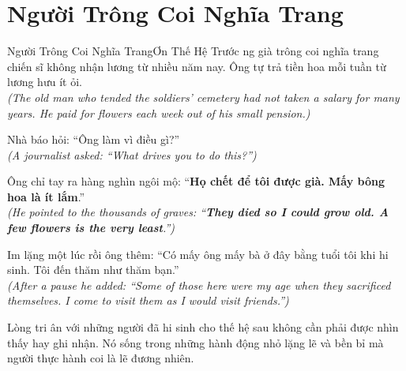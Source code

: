 \section{Người Trông Coi Nghĩa Trang}
\begin{truyen}{Người Trông Coi Nghĩa Trang}{Ơn Thế Hệ Trước}
ng già trông coi nghĩa trang chiến sĩ không nhận lương từ nhiều năm nay. Ông tự trả tiền hoa mỗi tuần từ lương hưu ít ỏi.\\
\textit{(The old man who tended the soldiers' cemetery had not taken a salary for many years. He paid for flowers each week out of his small pension.)}

Nhà báo hỏi: ``Ông làm vì điều gì?''\\
\textit{(A journalist asked: ``What drives you to do this?'')}

Ông chỉ tay ra hàng nghìn ngôi mộ: ``\textbf{Họ chết để tôi được già. Mấy bông hoa là ít lắm}.''\\
\textit{(He pointed to the thousands of graves: ``\textbf{They died so I could grow old. A few flowers is the very least}.'')}

Im lặng một lúc rồi ông thêm: ``Có mấy ông mấy bà ở đây bằng tuổi tôi khi hi sinh. Tôi đến thăm như thăm bạn.''\\
\textit{(After a pause he added: ``Some of those here were my age when they sacrificed themselves. I come to visit them as I would visit friends.'')}
\end{truyen}
\begin{baihoc}
  Lòng tri ân với những người đã hi sinh cho thế hệ sau không cần phải được nhìn thấy hay ghi nhận. Nó sống trong những hành động nhỏ lặng lẽ và bền bỉ mà người thực hành coi là lẽ đương nhiên.
\end{baihoc}

